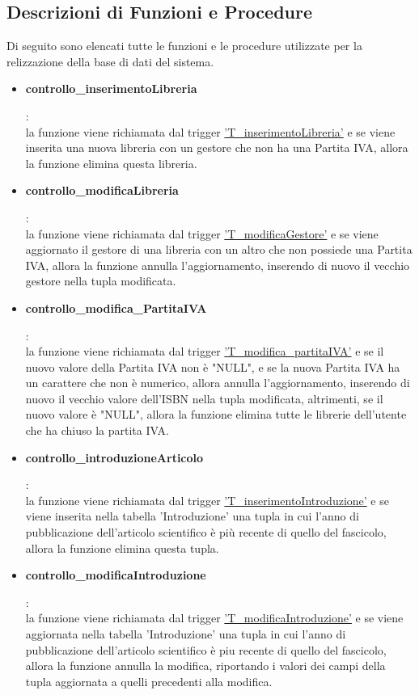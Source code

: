 \documentclass{article}
\begin{document}
\subsection{Descrizioni di Funzioni e Procedure}
Di seguito sono elencati tutte le funzioni e le procedure utilizzate per la relizzazione della base di dati del sistema.

\begin{itemize}
    \item \hypertarget{f1}{\textbf{controllo\_inserimentoLibreria}}:\\
    la funzione viene richiamata dal trigger \hyperlink{t1}{'T\_inserimentoLibreria'} e se viene inserita una nuova libreria con un gestore che non ha una Partita IVA, allora la funzione elimina questa libreria.

    \item \hypertarget{f2}{\textbf{controllo\_modificaLibreria}}:\\
    la funzione viene richiamata dal trigger \hyperlink{t2}{'T\_modificaGestore'} e se viene aggiornato il gestore di una libreria con un altro che non possiede una Partita IVA, allora la funzione annulla l'aggiornamento, inserendo di nuovo il vecchio gestore nella tupla modificata.

    \item \hypertarget{f3}{\textbf{controllo\_modifica\_PartitaIVA}}:\\
    la funzione viene richiamata dal trigger \hyperlink{t3}{'T\_modifica\_partitaIVA'} e se il nuovo valore della Partita IVA non è "NULL", e se la nuova Partita IVA ha un carattere che non è numerico, allora annulla l'aggiornamento, inserendo di nuovo il vecchio valore dell'ISBN nella tupla modificata, altrimenti, se il nuovo valore è "NULL", allora la funzione elimina tutte le librerie dell'utente che ha chiuso la partita IVA.

    \item \hypertarget{f4}{\textbf{controllo\_introduzioneArticolo}}:\\
    la funzione viene richiamata dal trigger \hyperlink{t4}{'T\_inserimentoIntroduzione'} e se viene inserita nella tabella 'Introduzione' una tupla in cui l'anno di pubblicazione dell'articolo scientifico è più recente di quello del fascicolo, allora la funzione elimina questa tupla.

    \item \hypertarget{f5}{\textbf{controllo\_modificaIntroduzione}}:\\
    la funzione viene richiamata dal trigger \hyperlink{t5}{'T\_modificaIntroduzione'} e se viene aggiornata nella tabella 'Introduzione' una tupla in cui l'anno di pubblicazione dell'articolo scientifico è piu recente di quello del fascicolo, allora la funzione annulla la modifica, riportando i valori dei campi della tupla aggiornata a quelli precedenti alla modifica.


\end{itemize}
\end{document}
